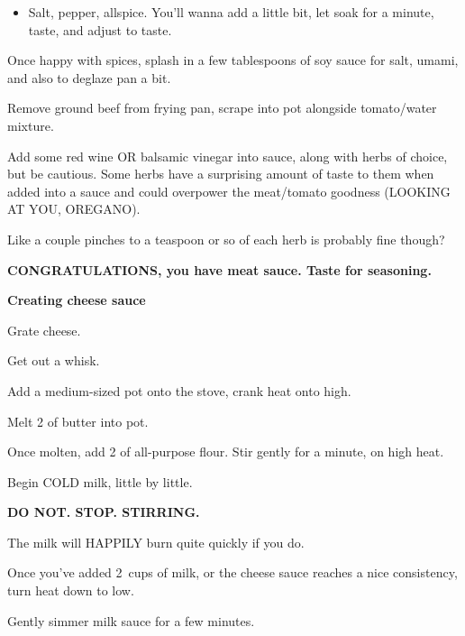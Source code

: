 \begin{recipe}
{\begin{itemize}
			\item Salt, pepper, allspice. You’ll wanna add a little bit, let soak for a minute, taste, and adjust to taste.
		\end{itemize}


		\step Once happy with spices, splash in a few tablespoons of soy sauce for salt, umami, and also to deglaze pan a bit.

		\step Remove ground beef from frying pan, scrape into pot alongside tomato/water mixture.

		\step Add some red wine OR balsamic vinegar into sauce, along with herbs of choice, but be cautious. Some herbs have a surprising amount of taste to them when added into a sauce and could overpower the meat/tomato goodness (LOOKING AT YOU, OREGANO).

		Like a couple pinches to a teaspoon or so of each herb is probably fine though?

		\textbf{\large CONGRATULATIONS, you have meat sauce. Taste for seasoning.}

		\textbf{\large Creating cheese sauce}

		\step Grate cheese.

		\vspace{1em}

		\step Get out a whisk.

		\vspace{1em}

		\step Add a medium-sized pot onto the stove, crank heat onto high.

		\vspace{1em}

		\step Melt \SI{2}{\tablespoon} of butter into pot.

		\vspace{1em}

		\step Once molten, add \SI{2}{\tablespoon} of all-purpose flour. Stir gently for a minute, on high heat.

		\step Begin COLD milk, little by little.

		\vspace{1em}

		\textbf{\Huge DO NOT. STOP. STIRRING.}

		The milk will HAPPILY burn quite quickly if you do.

		\step Once you’ve added \SI{2}{cups} of milk, or the cheese sauce reaches a nice consistency, turn heat down to low.

		\step Gently simmer milk sauce for a few minutes.

}
\end{recipe}
